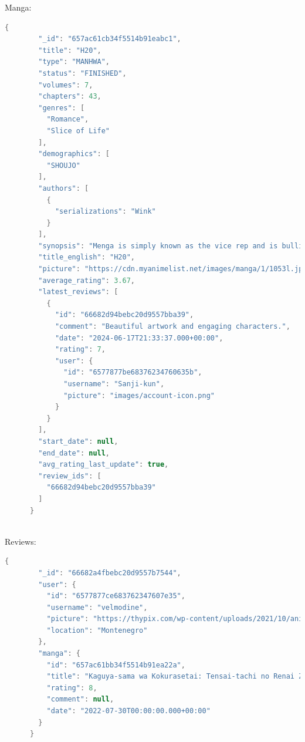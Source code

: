 \newpage
Manga:
\begin{mdframed}[backgroundcolor=yellow!20, innerleftmargin=10pt, innerrightmargin=10pt]
    \begin{lstlisting}[language=java]
      {
        "_id": "657ac61cb34f5514b91eabc1",
        "title": "H20",
        "type": "MANHWA",
        "status": "FINISHED",
        "volumes": 7,
        "chapters": 43,
        "genres": [
          "Romance",
          "Slice of Life"
        ],
        "demographics": [
          "SHOUJO"
        ],
        "authors": [
          {
            "serializations": "Wink"
          }
        ],
        "synopsis": "Menga is simply known as the vice rep and is bullied. Hanako has moved...",
        "title_english": "H20",
        "picture": "https://cdn.myanimelist.net/images/manga/1/1053l.jpg",
        "average_rating": 3.67,
        "latest_reviews": [
          {
            "id": "66682d94bebc20d9557bba39",
            "comment": "Beautiful artwork and engaging characters.",
            "date": "2024-06-17T21:33:37.000+00:00",
            "rating": 7,
            "user": {
              "id": "6577877be68376234760635b",
              "username": "Sanji-kun",
              "picture": "images/account-icon.png"
            }
          }
        ],
        "start_date": null,
        "end_date": null,
        "avg_rating_last_update": true,
        "review_ids": [
          "66682d94bebc20d9557bba39"
        ]
      }
      
    \end{lstlisting}
\end{mdframed}

\newpage

Reviews:
\begin{mdframed}[backgroundcolor=yellow!20, innerleftmargin=10pt, innerrightmargin=10pt]
    \begin{lstlisting}[language=java]
      {
        "_id": "66682a4fbebc20d9557b7544",
        "user": {
          "id": "6577877ce683762347607e35",
          "username": "velmodine",
          "picture": "https://thypix.com/wp-content/uploads/2021/10/anime-avatar-profile-pic...",
          "location": "Montenegro"
        },
        "manga": {
          "id": "657ac61bb34f5514b91ea22a",
          "title": "Kaguya-sama wa Kokurasetai: Tensai-tachi no Renai Zunousen",
          "rating": 8,
          "comment": null,
          "date": "2022-07-30T00:00:00.000+00:00"
        }
      }
      
    \end{lstlisting}
\end{mdframed}


